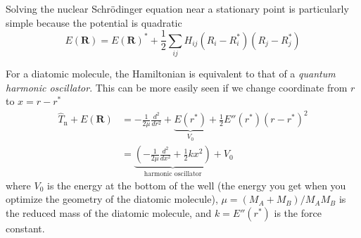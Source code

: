 \documentclass[../Main/chem371-notes.tex]{subfiles}
\begin{document}
Solving  the nuclear Schr\"{o}dinger equation near a stationary point is particularly simple because the potential is quadratic
\begin{equation}
E(\mathbf{R}) =
E(\mathbf{R})^*
+\frac{1}{2}
\sum_{ij} H_{ij} (R_i - R_i^*) (R_j - R_j^*) 
\end{equation}

For a diatomic molecule, the Hamiltonian is equivalent to that of a \emph{quantum harmonic oscillator}.
This can be more easily seen if we change coordinate from $r$ to $x = r - r^*$ 
\begin{equation}
\begin{split}
\hat{T}_\mathrm{n} + E(\mathbf{R}) & = -\frac{1}{2 \mu} \frac{d^2}{dr^2} + 
 \underbrace{E(r^*)}_{V_0} + \frac{1}{2} E''(r^*) (r - r^*)^2 \\
 & = \underbrace{\left( -\frac{1}{2 \mu} \frac{d^2}{dx^2} 
+ \frac{1}{2} k x^2 \right)}_{\text{harmonic oscillator}} + V_0
\end{split}
\end{equation}
where $V_0$ is the energy at the bottom of the well (the energy you get when you optimize the geometry of the diatomic molecule), $\mu = (M_A + M_B) / M_A M_B$ is the reduced mass of the diatomic molecule, and $k = E''(r^*)$ is the force constant.

\end{document}
